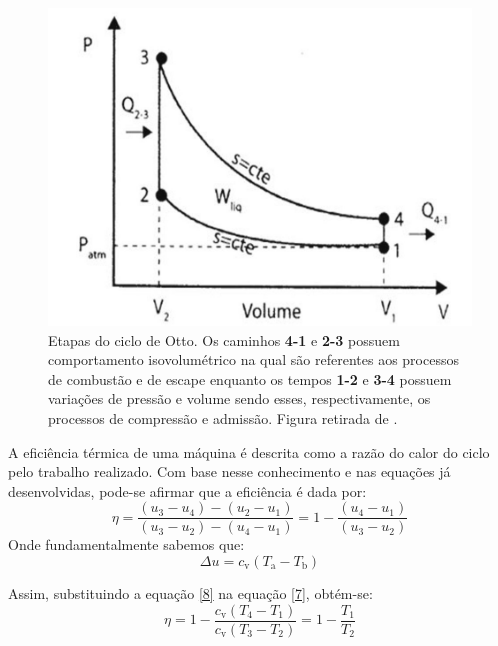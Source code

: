 \documentclass[10pt, conference, letterpaper]{IEEEtran}
\begin{document}
\begin{figure}[!ht]
    \centering
    \includegraphics[width=\columnwidth]{Imagens/CIcloOttoPV.jpg}
    \caption{Etapas do ciclo de Otto. Os caminhos \textbf{4-1} e \textbf{2-3} possuem comportamento isovolumétrico na qual são referentes aos processos de combustão e de escape enquanto os tempos \textbf{1-2} e \textbf{3-4} possuem variações de pressão e volume sendo esses, respectivamente, os processos de compressão e admissão. Figura retirada de \cite{reference1}. }
    \label{fig:etapas-otto-grafico}
\end{figure}


A eficiência térmica de uma máquina é descrita como a razão do calor do ciclo pelo trabalho realizado. Com base nesse conhecimento e nas equações já desenvolvidas, pode-se afirmar que a eficiência é dada por:
    \begin{equation}\label{7}
    \eta=\frac{(u_{\text{3}}-u_{\text{4}})-(u_{\text{2}}-u_{\text{1}})}{(u_{\text{3}}-u_{\text{2}})-(u_{\text{4}}-u_{\text{1}})}=1-\frac{(u_{\text{4}}-u_{\text{1}})}{(u_{\text{3}}-u_{\text{2}})}
    \end{equation}
    Onde fundamentalmente\cite{reference1} sabemos que: 
    \begin{equation}\label{8}
    \Delta u=c_{\text{v}}(T_{\text{a}}-T_{\text{b}})
    \end{equation}

Assim, substituindo a equação \ref{8} na equação \ref{7}, obtém-se:
\begin{equation}\label{9}
\eta=1-\frac{c_{\text{v}}(T_{\text{4}}-T_{\text{1}})}{c_{\text{v}}(T_{\text{3}}-T_{\text{2}})}=1-\frac{T_{\text{1}}}{T_{\text{2}}}
\end{equation}
\end{document}
